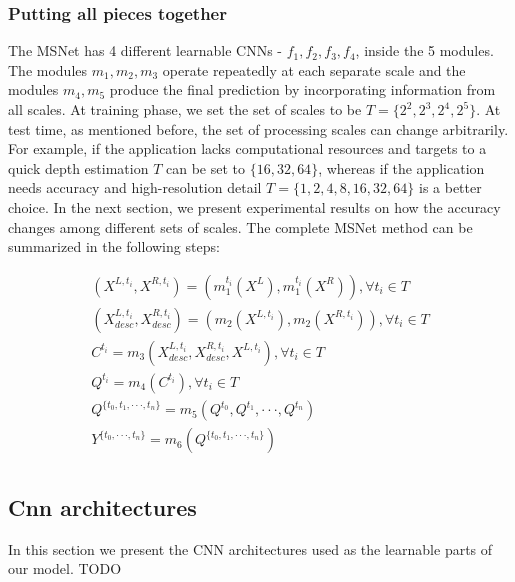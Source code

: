 \documentclass[runningheads]{llncs}
\begin{document}
\subsubsection{Putting all pieces together}

The MSNet has 4 different learnable CNNs - $f_1, f_2, f_3, f_4$, inside the 5 modules. The modules $m_1, m_2, m_3$ operate repeatedly at each separate scale and the modules $m_4, m_5$ produce the final prediction by incorporating information from all scales. At training phase, we set the set of scales to be $T = \{ 2^2, 2^3, 2^4, 2^5 \}$. At test time, as mentioned before, the set of processing scales can change arbitrarily. For example, if the application lacks computational resources and targets to a quick depth estimation $T$ can be set to $\{ 16, 32, 64\}$, whereas if the application needs accuracy and high-resolution detail $T = \{1, 2, 4, 8, 16, 32, 64 \}$ is a better choice. In the next section, we present experimental results on how the accuracy changes among different sets of scales. The complete MSNet method can be summarized in the following steps:

\begin{equation}
\begin{gathered} \label{eq:full_MSNet_model}
    (X^{L,t_i}, X^{R,t_i}) = (m_1^{t_i}(X^L), m_1^{t_i}(X^R)), \forall t_i \in T 
    \\
    (X^{L,t_i}_{desc}, X^{R,t_i}_{desc}) = (m_2(X^{L,t_i}), m_2(X^{R, t_i})), \forall t_i \in T 
    \\
    C^{t_i} = m_3(X^{L,t_i}_{desc}, X^{R,t_i}_{desc}, X^{L,t_i}), \forall t_i \in T 
    \\
    Q^{t_i} = m_4(C^{t_i}), \forall t_i \in T 
    \\
    Q^{\{t_0, t_1, \cdot \cdot \cdot, t_n\}} = m_5(Q^{t_0}, Q^{t_1}, \cdot \cdot \cdot, Q^{t_n}) 
    \\
    Y^{\{ t_0, \cdot \cdot \cdot, t_n \}} = m_6(Q^{\{t_0, t_1, \cdot \cdot \cdot, t_n\}}) 
    \\
\end{gathered}
\end{equation}


\subsection{Cnn architectures}

In this section we present the CNN architectures used as the learnable parts of our model. TODO
\end{document}
